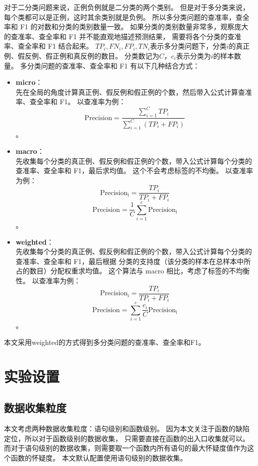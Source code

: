 对于二分类问题来说，正例负例就是二分类的两个类别。
但是对于多分类来说，每个类都可以是正例，这时其余类别就是负例。
所以多分类问题的查准率，查全率和 F1 的对数和分类的类别数量一致。
如果分类的类别数量非常多，观察庞大的查准率、查全率和 F1 并不能直观地描述预测结果，
需要将各个分类的查准率、查全率和 F1 结合起来。
$TP_i,FN_i,FP_i,TN_i$表示多分类问题下，分类$i$的真正例、假反例、假正例和真反例的数目。
分类数记为$C$，$c_i$表示分类为$i$的样本数量。
多分类问题的查准率、查全率和 F1 有以下几种结合方式：
\begin{itemize}
\item \textbf{micro}：\\
先在全局的角度计算真正例、假反例和假正例的个数，然后带入公式计算查准率、查全率和 F1。
以查准率为例：
$$
\mathrm{Precision} = \frac{\sum_{i=1}^C{TP_i}}{\sum_{i=1}^C{(TP_i + FP_i)}}
$$。
\item \textbf{macro}：\\
先收集每个分类的真正例、假反例和假正例的个数，带入公式计算每个分类的查准率、查全率和 F1，最后求均值。
这个不会考虑标签的不均衡。
以查准率为例：
$$
\mathrm{Precision_i} = \frac{TP_i}{TP_i + FP_i}
$$
$$
\mathrm{Precision} = \frac{1}{C}\sum_{i=1}^c{\mathrm{Precision_i}}
$$。
\item \textbf{weighted}：\\
先收集每个分类的真正例、假反例和假正例的个数，带入公式计算每个分类的查准率、查全率和 F1，最后根据
分类的支持度（该分类的样本在总样本中所占的数目）分配权重求均值。
这个算法与 macro 相比，考虑了标签的不均衡性。
以查准率为例：
$$
\mathrm{Precision_i} = \frac{TP_i}{TP_i + FP_i}
$$
$$
\mathrm{Precision} = \sum_{i=1}^c{\frac{c_i}{C}\mathrm{Precision_i}}
$$。
\end{itemize}

本文采用weighted的方式得到多分类问题的查准率、查全率和F1。

\section{实验设置}

\subsection{数据收集粒度}

本文考虑两种数据收集粒度：语句级别和函数级别。
因为本文关注于函数的缺陷定位，所以对于函数级别的数据收集，
只需要直接在函数的出入口收集就可以。
而对于语句级别的数据收集，则需要取一个函数内所有语句的最大怀疑度值作为这个函数的怀疑度。
本文默认配置使用语句级别的数据收集。

